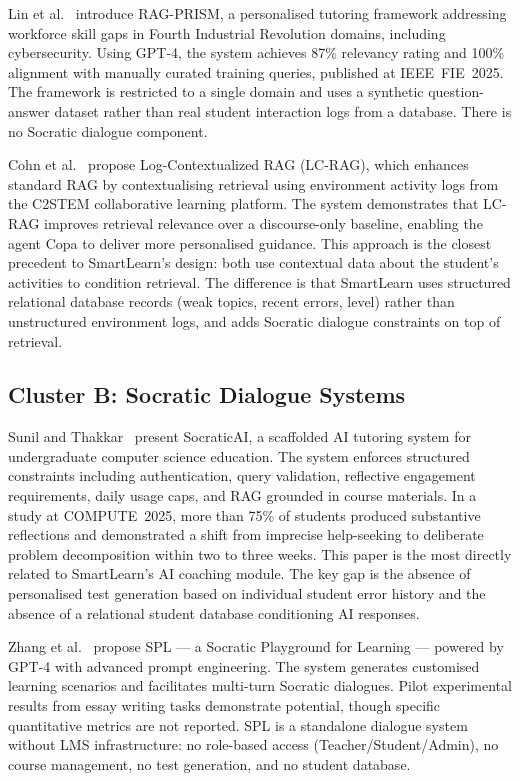 \documentclass[12pt,a4paper]{report}
\begin{document}
Lin et al.~\cite{ref3} introduce RAG-PRISM, a personalised tutoring framework
addressing workforce skill gaps in Fourth Industrial Revolution domains, including
cybersecurity. Using GPT-4, the system achieves 87\% relevancy rating and 100\%
alignment with manually curated training queries, published at IEEE~FIE~2025. The
framework is restricted to a single domain and uses a synthetic question-answer dataset
rather than real student interaction logs from a database. There is no Socratic
dialogue component.

Cohn et al.~\cite{ref4} propose Log-Contextualized RAG (LC-RAG), which enhances
standard RAG by contextualising retrieval using environment activity logs from the
C2STEM collaborative learning platform. The system demonstrates that LC-RAG improves
retrieval relevance over a discourse-only baseline, enabling the agent Copa to deliver
more personalised guidance. This approach is the closest precedent to SmartLearn's
design: both use contextual data about the student's activities to condition retrieval.
The difference is that SmartLearn uses structured relational database records (weak
topics, recent errors, level) rather than unstructured environment logs, and adds
Socratic dialogue constraints on top of retrieval.

\subsection{Cluster B: Socratic Dialogue Systems}

Sunil and Thakkar~\cite{ref5} present SocraticAI, a scaffolded AI tutoring system for
undergraduate computer science education. The system enforces structured constraints
including authentication, query validation, reflective engagement requirements, daily
usage caps, and RAG grounded in course materials. In a study at COMPUTE~2025, more than
75\% of students produced substantive reflections and demonstrated a shift from
imprecise help-seeking to deliberate problem decomposition within two to three weeks.
This paper is the most directly related to SmartLearn's AI coaching module. The key gap
is the absence of personalised test generation based on individual student error history
and the absence of a relational student database conditioning AI responses.

Zhang et al.~\cite{ref6} propose SPL --- a Socratic Playground for Learning ---
powered by GPT-4 with advanced prompt engineering. The system generates customised
learning scenarios and facilitates multi-turn Socratic dialogues. Pilot experimental
results from essay writing tasks demonstrate potential, though specific quantitative
metrics are not reported. SPL is a standalone dialogue system without LMS
infrastructure: no role-based access (Teacher/Student/Admin), no course management, no
test generation, and no student database.
\end{document}
